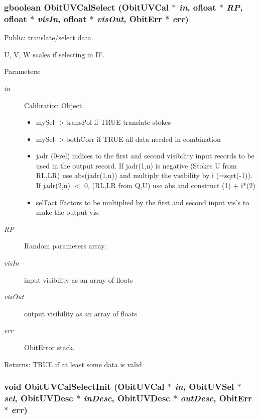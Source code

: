 \subsubsection{\setlength{\rightskip}{0pt plus 5cm}gboolean Obit\-UVCal\-Select ({\bf Obit\-UVCal} $\ast$ {\em in}, {\bf ofloat} $\ast$ {\em RP}, {\bf ofloat} $\ast$ {\em vis\-In}, {\bf ofloat} $\ast$ {\em vis\-Out}, {\bf Obit\-Err} $\ast$ {\em err})}\label{ObitUVCalSelect_8c_a9}


Public: translate/select data. 

U, V, W scales if selecting in IF. \begin{Desc}
\item[Parameters:]
\begin{description}
\item[{\em in}]Calibration Object. \begin{itemize}
\item my\-Sel-$>$trans\-Pol if TRUE translate stokes \item my\-Sel-$>$both\-Corr if TRUE all data needed in combination \item jadr (0-rel) indices to the first and second visibility input records to be used in the output record. If jadr(1,n) is negative (Stokes U from RL,LR) use abs(jadr(1,n)) and multiply the visibility by i (=sqrt(-1)). If jadr(2,n) $<$ 0, (RL,LR from Q,U) use abs and construct (1) + i$\ast$(2) \item sel\-Fact Factors to be multiplied by the first and second input vis's to make the output vis. \end{itemize}
\item[{\em RP}]Random parameters array. \item[{\em vis\-In}]input visibility as an array of floats \item[{\em vis\-Out}]output visibility as an array of floats \item[{\em err}]Obit\-Error stack. \end{description}
\end{Desc}
\begin{Desc}
\item[Returns:]TRUE if at least some data is valid \end{Desc}
\subsubsection{\setlength{\rightskip}{0pt plus 5cm}void Obit\-UVCal\-Select\-Init ({\bf Obit\-UVCal} $\ast$ {\em in}, {\bf Obit\-UVSel} $\ast$ {\em sel}, {\bf Obit\-UVDesc} $\ast$ {\em in\-Desc}, {\bf Obit\-UVDesc} $\ast$ {\em out\-Desc}, {\bf Obit\-Err} $\ast$ {\em err})}\label{ObitUVCalSelect_8c_a8}


